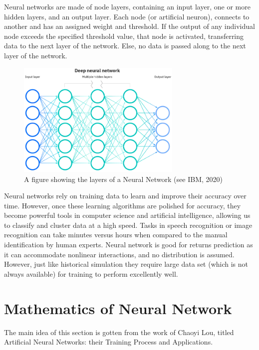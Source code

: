 \documentclass[a4paper,11pt,oneside]{book}
\begin{document}
Neural networks are made of node layers, containing an input layer, one or more hidden layers, and an output layer. Each node (or artificial neuron), connects to another and has an assigned weight and threshold. If the output of any individual node exceeds the specified threshold value, that node is activated, transferring data to the next layer of the network. Else, no data is passed along to the next layer of the network.
\begin{figure}[!h]
	\centering
	\includegraphics[width=0.7\textwidth]{figures/NN}
	\caption{A figure showing the layers of a Neural Network (see IBM, 2020)}
	\label{firstfig}
\end{figure}\newline
Neural networks rely on training data to learn and improve their accuracy over time. However, once these learning algorithms are polished for accuracy, they become powerful tools in computer science and artificial intelligence, allowing us to classify and cluster data at a high speed. Tasks in speech recognition or image recognition can take minutes versus hours when compared to the manual identification by human experts.
\newline\newline
Neural network is good for returns prediction as it can accommodate nonlinear interactions, and no distribution is assumed. However, just like historical simulation they require large data set (which is not always available) for training to perform excellently well.





\section{Mathematics of Neural Network}
The main idea of this section is gotten from the work of Chaoyi Lou, titled Artificial Neural Networks:
their Training Process and Applications.
\end{document}
